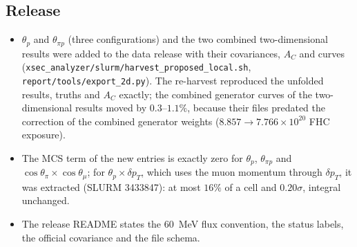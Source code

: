 \subsection{Release}
\begin{itemize}\itemsep1pt
  \item $\theta_p$ and $\theta_{\pi p}$ (three configurations) and the two combined two-dimensional
    results were added to the data release with their covariances, $A_C$ and curves
    (\texttt{xsec\_analyzer/slurm/harvest\_proposed\_local.sh}, \texttt{report/tools/export\_2d.py}). The
    re-harvest reproduced the unfolded results, truths and $A_C$ exactly; the combined generator curves
    of the two-dimensional results moved by $0.3$--$1.1\%$, because their files predated the correction
    of the combined generator weights ($8.857\to7.766\times10^{20}$ FHC exposure).
  \item The MCS term of the new entries is exactly zero for $\theta_p$, $\theta_{\pi p}$ and
    $\cos\theta_\pi\times\cos\theta_\mu$; for $\theta_p\times\delta p_T$, which uses the muon momentum
    through $\delta p_T$, it was extracted (SLURM 3433847): at most $16\%$ of a cell and $0.20\sigma$,
    integral unchanged.
  \item The release README states the $60$~MeV flux convention, the status labels, the official
    covariance and the file schema.
\end{itemize}

